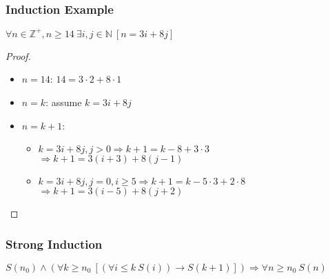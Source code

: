 \documentclass[dvipsnames]{beamer}
\begin{document}
\begin{frame}
  \frametitle{Induction Example}

  \begin{theorem}
    $\forall n \in \mathbb{Z}^+, n \geq 14~\exists i,j \in \mathbb{N}~[n=3i+8j]$
  \end{theorem}

  \pause
  \begin{proof}
    \begin{itemize}
      \item $n=14$: $14=3 \cdot 2 + 8 \cdot 1$

      \pause
      \item $n=k$: assume $k=3i+8j$

      \pause
      \item $n=k+1$:
      \begin{itemize}
        \item $k=3i+8j, j>0 \Rightarrow k+1=k-8+3 \cdot 3$\\
          $\Rightarrow k+1=3(i+3)+8(j-1)$
        \item $k=3i+8j, j=0, i \geq 5 \Rightarrow k+1=k-5 \cdot 3+2 \cdot 8$\\
          $\Rightarrow k+1=3(i-5)+8(j+2)$
      \end{itemize}
    \end{itemize}
  \end{proof}
\end{frame}

\begin{frame}
  \frametitle{Strong Induction}

  \begin{definition}
    $S(n_0) \wedge
      (\forall k \geq n_0~[(\forall i \leq k~S(i)) \rightarrow S(k+1)])
      \Rightarrow \forall n \geq n_0~S(n)$
  \end{definition}
\end{frame}
\end{document}
